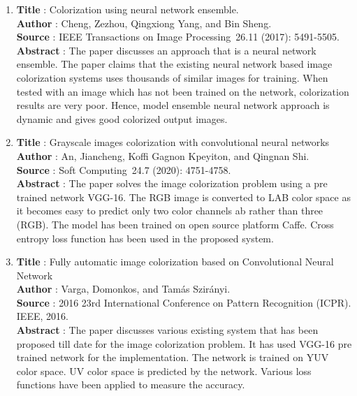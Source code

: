 \documentclass[12pt]{report}	%
\begin{document}
\begin{enumerate}
	\item{\bf Title} : Colorization using neural network ensemble.\\
	{\bf Author} : Cheng, Zezhou, Qingxiong Yang, and Bin Sheng.\\
	{\bf Source} : IEEE Transactions on Image Processing 26.11 (2017): 5491-5505.\\
	{\bf Abstract} : The paper discusses an approach that is a neural network ensemble. The paper claims that the existing neural network based image colorization systems uses thousands of similar images for training. When tested with an image which has not been trained on the network, colorization results are very poor. Hence, model ensemble neural network approach is dynamic and gives good colorized output images. \\
	
	\item{\bf Title} : Grayscale images colorization with convolutional neural networks\\
	{\bf Author} : An, Jiancheng, Koffi Gagnon Kpeyiton, and Qingnan Shi.\\
	{\bf Source} : Soft Computing 24.7 (2020): 4751-4758.\\
	{\bf Abstract} : The paper solves the image colorization problem using a pre trained network VGG-16. The RGB image is converted to LAB color space as it becomes easy to predict only two color channels ab rather than three (RGB). The model has been trained on open source platform Caffe. Cross entropy loss function has been used in the proposed system. \\
	
	\item{\bf Title} : Fully automatic image colorization based on Convolutional Neural Network\\
	{\bf Author} : Varga, Domonkos, and Tamás Szirányi.\\
	{\bf Source} : 2016 23rd International Conference on Pattern Recognition (ICPR). IEEE, 2016.\\
	{\bf Abstract} : The paper discusses various existing system that has been proposed till date for the image colorization problem. It has used VGG-16 pre trained network for the implementation. The network is trained on YUV color space. UV color space is predicted by the network. Various loss functions have been applied to measure the accuracy. \\


\end{enumerate}
\end{document}
